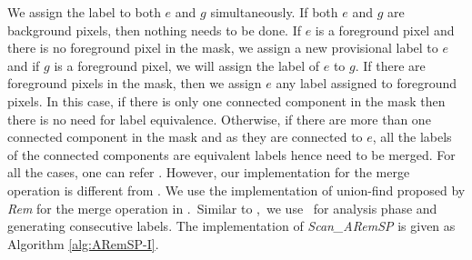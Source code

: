 We assign the label to both $e$ and $g$ simultaneously. If both $e$ and $g$ are
background pixels, then nothing needs to be done. If $e$ is a foreground pixel and there is no foreground pixel in the mask, we assign a 
new provisional label to $e$ and if $g$ is a foreground pixel, we will assign
the label of $e$ to $g$. If there are foreground pixels in the mask, then we assign $e$ any label assigned to 
foreground pixels. In this case, if there is only one connected component in the mask then there is 
no need for label equivalence. Otherwise, if there are more than one connected component in the mask and as 
they are connected to $e$, all the labels of the connected components are
equivalent labels hence need to be merged. For all the cases, one can refer
\cite{He2012_ARun}.
However, our implementation for the merge operation is different from \cite{He2012_ARun}.
We use the implementation of union-find proposed by {\em Rem} \cite{Patwary2010_RemSP, Dijkstra1976_RemSP} for the merge operation in
\aremsp.\ Similar to \nremsp,\ we use \flatten\ for analysis phase
and generating consecutive labels. The implementation of {\em Scan\_ARemSP} is given as Algorithm
\ref{alg:ARemSP-I}.

%
% 





 
